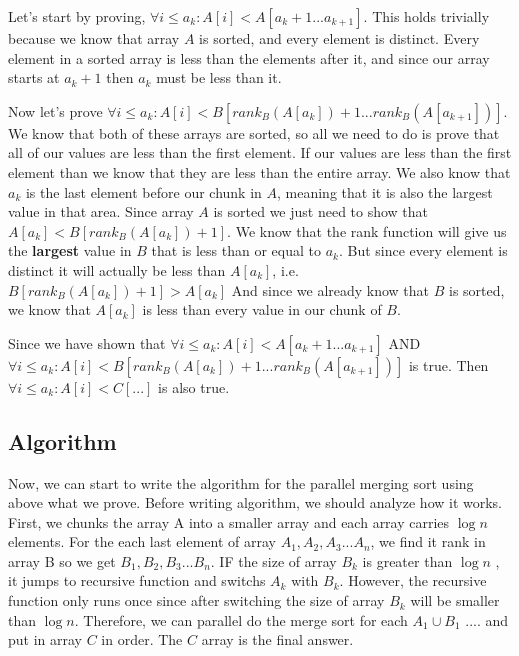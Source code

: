 \documentclass[11pt]{article}
\begin{document}
Let's start by proving, $\forall i \leq a_k : A[i] < A[a_k+1 ... a_{k+1}]$. This holds trivially because we know that array $A$ is sorted, and every element is distinct. Every element in a sorted array is less than the elements after it, and since our array starts at $a_k+1$ then $a_k$ must be less than it.

Now let's prove $\forall i \leq a_k : A[i] < B[rank_B(A[a_k])+1 ... rank_B(A[a_{k+1}])]$. We know that both of these arrays are sorted, so all we need to do is prove that all of our values are less than the first element. If our values are less than the first element than we know that they are less than the entire array. We also know that $a_k$ is the last element before our chunk in $A$, meaning that it is also the largest value in that area. Since array $A$ is sorted we just need to show that $A[a_k] < B[rank_B(A[a_k])+1]$. We know that the rank function will give us the \textbf{largest} value in $B$ that is less than or equal to $a_k$. But since every element is distinct it will actually be less than $A[a_k]$, i.e. $B[rank_B(A[a_k])+1] > A[a_k]$  And since we already know that $B$ is sorted, we know that $A[a_k]$ is less than every value in our chunk of $B$.

Since we have shown that $\forall i \leq a_k : A[i] < A[a_k+1 ... a_{k+1}]$ AND $\forall i \leq a_k : A[i] < B[rank_B(A[a_k])+1 ... rank_B(A[a_{k+1}])]$ is true. Then $\forall i \leq a_k : A[i] < C[...]$ is also true.

\subsection{Algorithm}
Now, we can start to write the algorithm for the parallel merging sort using above what we prove.
Before writing algorithm, we should analyze how it works.  First, we chunks the array A into a smaller array and each array carries $\log n$ elements.  For the each last element of array $A_1, A_2, A_3 ... A_n$,  we find it rank in array B so we get $B_1, B_2, B_3 ... B_n$.  IF the size of array $B_k$ is greater than $\log n$ , it jumps to recursive function and switchs $A_k$ with $B_k$.  However, the recursive function only runs once since after switching the size of array $B_k$ will be smaller than $\log n$. Therefore, we can parallel do the merge sort for each $A_1 \cup B_1$ .... and put in array $C$ in order.  The $C$ array is the final answer.
\end{document}
